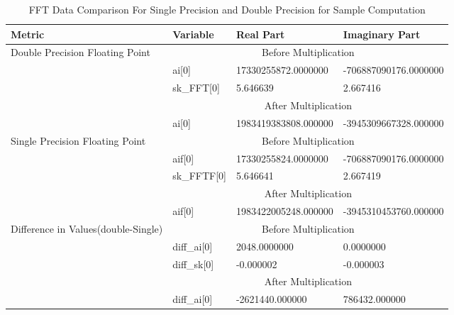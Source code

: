\begin{table}[!h]
\centering
\caption{FFT Data Comparison For Single Precision and Double Precision for Sample Computation}
\label{Table 3.2}
\begin{tabular}{||m{3cm}|m{1.8cm}|m{4.3cm}|m{4.3cm}||}
\hline
Metric & Variable & Real Part &Imaginary Part\\[1.5ex]
\hline
\hline
\multirow{5}{*}{\parbox{3cm}{Double Precision Floating Point}} & \multicolumn{3}{|c||}{Before Multiplication}\\[1.5ex]\cline{2-4}
  & ai[0] & 17330255872.0000000 &  -706887090176.0000000  \\[1.5ex]\cline{2-4}
&sk\_FFT[0] & 5.646639 &2.667416 \\[1.5ex]\cline{2-4}
& \multicolumn{3}{|c||}{After Multiplication}\\[1.5ex]\cline{2-4}
&ai[0] & 1983419383808.000000 &-3945309667328.000000 \\[1.5ex]
\hline
\hline
\multirow{5}{*}{\parbox{3cm}{Single Precision Floating Point}} & \multicolumn{3}{|c||}{Before Multiplication}\\[1.5ex]\cline{2-4}
&aif[0] & 17330255824.0000000 & -706887090176.0000000   \\[1.5ex]\cline{2-4}
&sk\_FFTF[0] & 5.646641 &2.667419 \\[1.5ex]\cline{2-4}
& \multicolumn{3}{|c||}{After Multiplication}\\[1.5ex]\cline{2-4}
&aif[0] & 1983422005248.000000 &-3945310453760.000000 \\[1.5ex]
\hline
\hline
\multirow{5}{*}{\parbox{3cm}{Difference in Values(double-Single)}} & \multicolumn{3}{|c||}{Before Multiplication}\\[1.5ex]\cline{2-4}
&diff\_ai[0] & 2048.0000000 & 0.0000000   \\[1.5ex]\cline{2-4}
&diff\_sk[0] & -0.000002 &-0.000003 \\[1.5ex]\cline{2-4}
& \multicolumn{3}{|c||}{After Multiplication}\\[1.5ex]\cline{2-4}
&diff\_ai[0] & -2621440.000000 &786432.000000 \\[1.5ex]
\hline
\end{tabular}
\end{table}